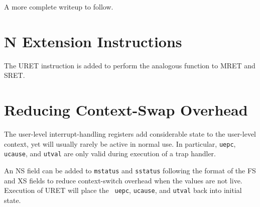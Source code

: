\begin{commentary}
  A more complete writeup to follow.
\end{commentary}

\section{N Extension Instructions}

The URET instruction is added to perform the analogous function to
MRET and SRET.

\section{Reducing Context-Swap Overhead}

The user-level interrupt-handling registers add considerable state to
the user-level context, yet will usually rarely be active in normal
use.  In particular, {\tt uepc}, {\tt ucause}, and {\tt utval} are
only valid during execution of a trap handler.

An NS field can be added to {\tt mstatus} and {\tt sstatus} following
the format of the FS and XS fields to reduce context-switch overhead
when the values are not live.  Execution of URET will place the {\tt
  uepc}, {\tt ucause}, and {\tt utval} back into initial state.
